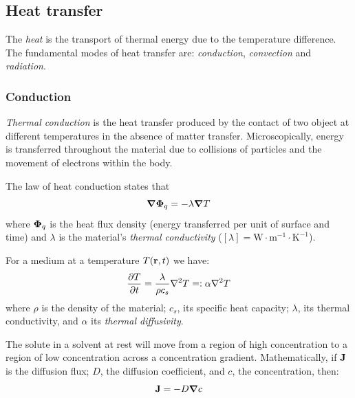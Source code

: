 \documentclass[../../../main.tex]{subfiles}
\begin{document}
\begin{multicols}{2}
    \subsection{Heat transfer}
    \begin{definition}[Heat]
        The \textit{heat} is the transport of thermal energy due to the temperature difference. The fundamental modes of heat transfer are: \textit{conduction}, \textit{convection} and \textit{radiation}.
    \end{definition}
    \subsubsection*{Conduction}
    \begin{definition}[Conduction]
        \textit{Thermal conduction} is the heat transfer produced by the contact of two object at different temperatures in the absence of matter transfer. Microscopically, energy is transferred throughout the material due to collisions of particles and the movement of electrons within the body.
    \end{definition}
    \begin{law}
        The law of heat conduction states that
        $$\grad\boldsymbol{\mathrm{\Phi}}_q=-\lambda\grad T$$ where $\boldsymbol{\mathrm{\Phi}}_q$ is the heat flux density (energy transferred per unit of surface and time) and $\lambda$ is the material's \textit{thermal conductivity} ($[\lambda]=\text{W}\cdot\text{m}^{-1}\cdot\text{K}^{-1}$).
    \end{law}
    \begin{prop}
        For a medium at a temperature $T(\boldsymbol{\mathrm{r}},t)$ we have:
        $$\pdv{T}{t}=\frac{\lambda}{\rho c_s}\laplacian T=:\alpha\laplacian T$$
        where $\rho$ is the density of the material; $c_s$, its specific heat capacity; $\lambda$, its thermal conductivity, and $\alpha$ its \textit{thermal diffusivity}.
    \end{prop}
    \begin{law}
        The solute in a solvent at rest will move from a region of high concentration to a region of low concentration across a concentration gradient. Mathematically, if $\boldsymbol{\mathrm{J}}$ is the diffusion flux; $D$, the diffusion coefficient, and $c$, the concentration, then:
        $$\boldsymbol{\mathrm{J}}=-D\grad c$$
    \end{law}
    \begin{prop}

\end{prop}
\end{multicols}
\end{document}
